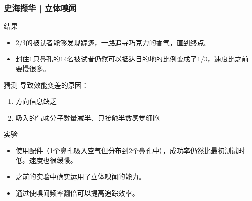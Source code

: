 \begin{frame}
  \frametitle{史海撷华 | 立体嗅闻}
  \begin{block}{结果}
    \begin{itemize}
      \item 2/3的被试者能够发现踪迹，一路追寻巧克力的香气，直到终点。
      \item 封住1只鼻孔的14名被试者仍然可以抵达目的地的比例变成了1/3，速度比之前要慢很多。
    \end{itemize}
  \end{block}
  \vspace{-0.6em}
  \pause
  \begin{block}{猜测}
     导致效能变差的原因：
     \begin{enumerate}
       \item 方向信息缺乏
       \item 吸入的气味分子数量减半、只接触半数感觉细胞
     \end{enumerate}
  \end{block}
  \vspace{-0.6em}
  \pause
  \begin{block}{实验}
    \begin{itemize}
      \item 使用配件（1个鼻孔吸入空气但分布到2个鼻孔中），成功率仍然比最初测试时低，速度也很缓慢。
      \item 之前的实验中确实运用了立体嗅闻的能力。
      \item 通过使嗅闻频率翻倍可以提高追踪效率。
    \end{itemize}
  \end{block}
\end{frame}

